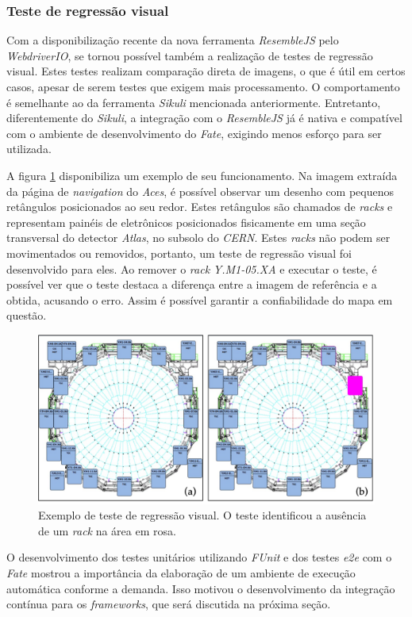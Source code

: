 \hypertarget{teste-de-regressao-visual}{%
\subsubsection{Teste de regressão visual}\label{teste-de-regressao-visual}}

Com a disponibilização recente da nova ferramenta \emph{ResembleJS} pelo \emph{WebdriverIO}, se tornou possível também a realização de testes de regressão visual. Estes testes realizam comparação direta de imagens, o que é útil em certos casos, apesar de serem testes que exigem mais processamento. O comportamento é semelhante ao da ferramenta \emph{Sikuli} mencionada anteriormente. Entretanto, diferentemente do \emph{Sikuli}, a integração com o \emph{ResembleJS} já é nativa e compatível com o ambiente de desenvolvimento do \emph{Fate}, exigindo menos esforço para ser utilizada.

A figura \ref{fig:aces-example-2} disponibiliza um exemplo de seu funcionamento. Na imagem extraída da página de \emph{navigation} do \emph{Aces}, é possível observar um desenho com pequenos retângulos posicionados ao seu redor. Estes retângulos são chamados de \emph{racks} e representam painéis de eletrônicos posicionados fisicamente em uma seção transversal do detector \emph{Atlas}, no subsolo do \emph{CERN}. Estes \emph{racks} não podem ser movimentados ou removidos, portanto, um teste de regressão visual foi desenvolvido para eles. Ao remover o \emph{rack} \emph{Y.M1-05.XA} e executar o teste, é possível ver que o teste destaca a diferença entre a imagem de referência e a obtida, acusando o erro. Assim é possível garantir a confiabilidade do mapa em questão.

\begin{figure}[H]
    \centering
    \includegraphics[width=13cm]{source/4-solucao/images/aces-example-2.png}
    \caption{Exemplo de teste de regressão visual. O teste identificou a ausência de um \emph{rack} na área em rosa.}
    \label{fig:aces-example-2}
\end{figure}

O desenvolvimento dos testes unitários utilizando \emph{FUnit} e dos testes \emph{e2e} com o \emph{Fate} mostrou a importância da elaboração de um ambiente de execução automática conforme a demanda. Isso motivou o desenvolvimento da integração contínua para os \emph{frameworks}, que será discutida na próxima seção.
